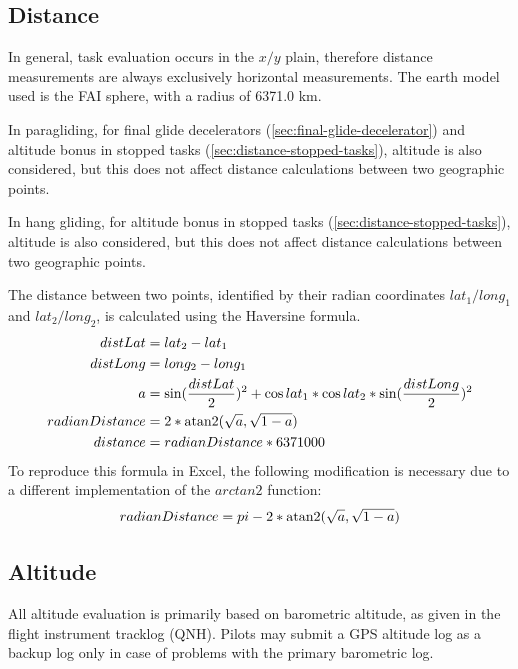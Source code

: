 \documentclass{article}
\begin{document}
\subsection{Distance}
\label{sec:distance}
In general, task evaluation occurs in the \(x/y\) plain, therefore distance
measurements are always exclusively horizontal measurements. The earth model used
is the FAI sphere, with a radius of 6371.0 km.

\begin{pg}
In paragliding, for final glide decelerators (\ref{sec:final-glide-decelerator})
and altitude bonus in stopped tasks (\ref{sec:distance-stopped-tasks}), altitude
is also considered, but this does not affect distance calculations between two
geographic points.
\end{pg}

\begin{hg}
In hang gliding, for altitude bonus in stopped tasks (\ref{sec:distance-stopped-tasks}),
altitude is also considered, but this does not affect distance calculations between
two geographic points.
\end{hg}

The distance between two points, identified by their radian coordinates
\(lat_1/long_1\) and \(lat_2/long_2\), is calculated using the Haversine formula.
\begin{align*}
    distLat &= lat_2 - lat_1 \\
    distLong &= long_2 - long_1 \\
    a &= \sin(\frac{distLat}{2})^2 + \cos lat_1 * \cos lat_2 * \sin(\frac{distLong}{2})^2 \\
    radianDistance &= 2 * \operatorname{atan2}(\sqrt a, \sqrt{1 - a}) \\
    distance &= radianDistance * 6371000 \\
\end{align*}
To reproduce this formula in Excel, the following modification is necessary due
to a different implementation of the \(arctan2\) function:
\[ radianDistance = pi - 2 * \operatorname{atan2}(\sqrt a, \sqrt{1 - a}) \]

\subsection{Altitude}
All altitude evaluation is primarily based on barometric altitude, as given in
the flight instrument tracklog (QNH). Pilots may submit a GPS altitude log as
a backup log only in case of problems with the primary barometric log.
\end{document}
